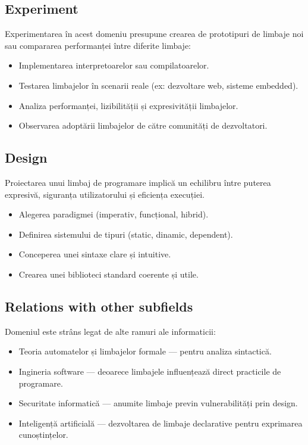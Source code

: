 \documentclass[12pt, letterpaper]{article}
\begin{document}
\subsection*{Experiment}
Experimentarea în acest domeniu presupune crearea de prototipuri de limbaje noi sau compararea performanței între diferite limbaje:
\begin{itemize}
    \item Implementarea interpretoarelor sau compilatoarelor.
    \item Testarea limbajelor în scenarii reale (ex: dezvoltare web, sisteme embedded).
    \item Analiza performanței, lizibilității și expresivității limbajelor.
    \item Observarea adoptării limbajelor de către comunități de dezvoltatori.
\end{itemize}

\subsection*{Design}
Proiectarea unui limbaj de programare implică un echilibru între puterea expresivă, siguranța utilizatorului și eficiența execuției.
\begin{itemize}
    \item Alegerea paradigmei (imperativ, funcțional, hibrid).
    \item Definirea sistemului de tipuri (static, dinamic, dependent).
    \item Conceperea unei sintaxe clare și intuitive.
    \item Crearea unei biblioteci standard coerente și utile.
\end{itemize}

\subsection*{Relations with other subfields}
Domeniul este strâns legat de alte ramuri ale informaticii:
\begin{itemize}
    \item Teoria automatelor și limbajelor formale — pentru analiza sintactică.
    \item Ingineria software — deoarece limbajele influențează direct practicile de programare.
    \item Securitate informatică — anumite limbaje previn vulnerabilități prin design.
    \item Inteligență artificială — dezvoltarea de limbaje declarative pentru exprimarea cunoștințelor.
\end{itemize}
\end{document}
